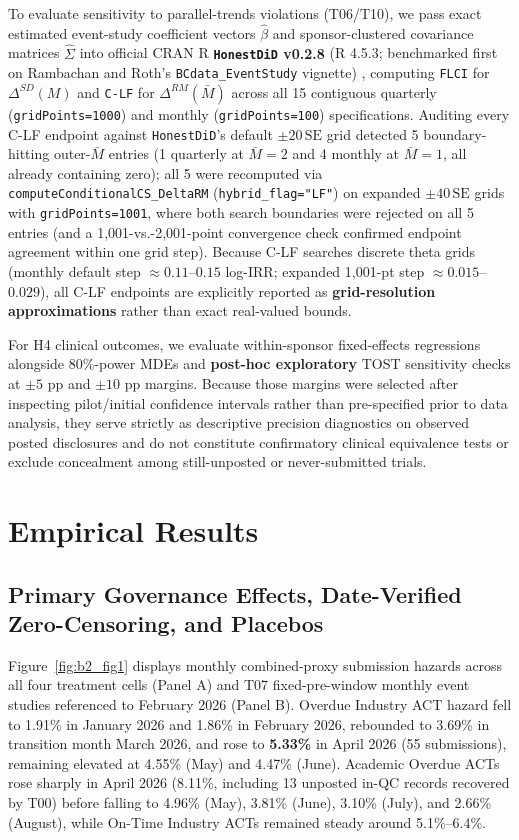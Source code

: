 \documentclass[11pt,letterpaper]{article}
\begin{document}
To evaluate sensitivity to parallel-trends violations (T06/T10), we pass exact estimated event-study coefficient vectors $\hat{\beta}$ and sponsor-clustered covariance matrices $\hat{\Sigma}$ into official CRAN R \textbf{\texttt{HonestDiD} v0.2.8} (R 4.5.3; benchmarked first on Rambachan and Roth's \texttt{BCdata\_EventStudy} vignette) \citep{rambachan2023}, computing \texttt{FLCI} for $\Delta^{SD}(M)$ and \texttt{C-LF} for $\Delta^{RM}(\bar{M})$ across all 15 contiguous quarterly (\texttt{gridPoints=1000}) and monthly (\texttt{gridPoints=100}) specifications. Auditing every C-LF endpoint against \texttt{HonestDiD}'s default $\pm 20\,\mathrm{SE}$ grid detected 5 boundary-hitting outer-$\bar{M}$ entries (1 quarterly at $\bar{M}=2$ and 4 monthly at $\bar{M}=1$, all already containing zero); all 5 were recomputed via \texttt{computeConditionalCS\_DeltaRM} (\texttt{hybrid\_flag="LF"}) on expanded $\pm 40\,\mathrm{SE}$ grids with \texttt{gridPoints=1001}, where both search boundaries were rejected on all 5 entries (and a 1,001-vs.-2,001-point convergence check confirmed endpoint agreement within one grid step). Because C-LF searches discrete theta grids (monthly default step $\approx 0.11$--$0.15$ log-IRR; expanded 1,001-pt step $\approx 0.015$--$0.029$), all C-LF endpoints are explicitly reported as \textbf{grid-resolution approximations} rather than exact real-valued bounds.

For H4 clinical outcomes, we evaluate within-sponsor fixed-effects regressions alongside 80\%-power MDEs and \textbf{post-hoc exploratory} TOST sensitivity checks at $\pm 5$ pp and $\pm 10$ pp margins. Because those margins were selected after inspecting pilot/initial confidence intervals rather than pre-specified prior to data analysis, they serve strictly as descriptive precision diagnostics on observed posted disclosures and do not constitute confirmatory clinical equivalence tests or exclude concealment among still-unposted or never-submitted trials.

\section{Empirical Results}

\subsection{Primary Governance Effects, Date-Verified Zero-Censoring, and Placebos}
Figure~\ref{fig:b2_fig1} displays monthly combined-proxy submission hazards across all four treatment cells (Panel A) and T07 fixed-pre-window monthly event studies referenced to February 2026 (Panel B). Overdue Industry ACT hazard fell to 1.91\% in January 2026 and 1.86\% in February 2026, rebounded to 3.69\% in transition month March 2026, and rose to \textbf{5.33\%} in April 2026 (55 submissions), remaining elevated at 4.55\% (May) and 4.47\% (June). Academic Overdue ACTs rose sharply in April 2026 (8.11\%, including 13 unposted in-QC records recovered by T00) before falling to 4.96\% (May), 3.81\% (June), 3.10\% (July), and 2.66\% (August), while On-Time Industry ACTs remained steady around 5.1\%--6.4\%.
\end{document}
